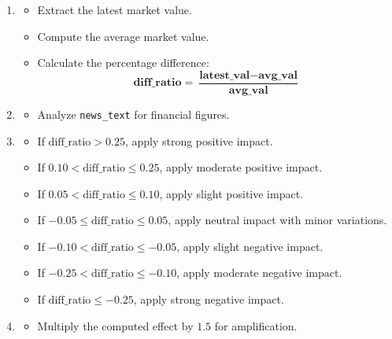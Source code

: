 \documentclass[3p,times,procedia]{elsarticle}
\begin{document}
\begin{enumerate}
    \item {}
    \begin{itemize}
        \item Extract the latest market value.
        \item Compute the average market value.
        \item Calculate the percentage difference:
       \begin{equation}
\bm{\textbf{diff\_ratio} = \frac{\textbf{latest\_val} - \textbf{avg\_val}}{\textbf{avg\_val}}}
\end{equation}

    \end{itemize}

    \item {}
    \begin{itemize}
        \item Analyze \texttt{news\_text} for financial figures.
    \end{itemize}

\item {}
    \begin{itemize}
        \item If $\text{diff\_ratio} > 0.25$, apply strong positive impact.
        \item If $0.10 < \text{diff\_ratio} \leq 0.25$, apply moderate positive impact.
        \item If $0.05 < \text{diff\_ratio} \leq 0.10$, apply slight positive impact.
        \item If $-0.05 \leq \text{diff\_ratio} \leq 0.05$, apply neutral impact with minor variations.
        \item If $-0.10 < \text{diff\_ratio} \leq -0.05$, apply slight negative impact.
        \item If $-0.25 < \text{diff\_ratio} \leq -0.10$, apply moderate negative impact.
        \item If $\text{diff\_ratio} \leq -0.25$, apply strong negative impact.
    \end{itemize}

    \item {}
    \begin{itemize}
        \item Multiply the computed effect by $1.5$ for amplification.
    \end{itemize}
\end{enumerate}
\end{document}

